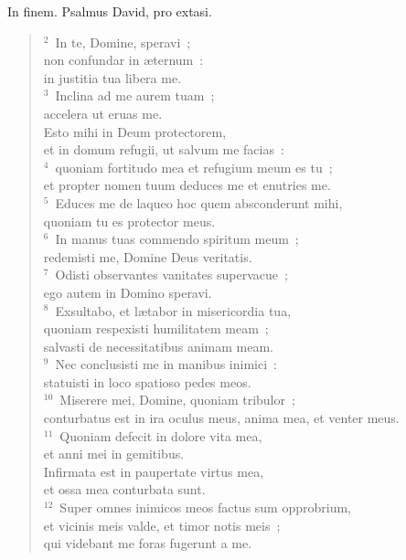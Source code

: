\lettrine[lines=3,image=true,loversize=0.05,lraise=-0.03]{I}{}n finem. Psalmus David, pro extasi.
\begin{flushleft}\begin{verse}\vspace{6pt}${}^{2}$~In te, Domine, speravi~;\\ non confundar in \ae ternum~:\\ in justitia tua libera me.\\
${}^{3}$~Inclina ad me aurem tuam~;\\ accelera ut eruas me.\\ Esto mihi in Deum protectorem,\\ et in domum refugii, ut salvum me facias~:\\
${}^{4}$~quoniam fortitudo mea et refugium meum es tu~;\\ et propter nomen tuum deduces me et enutries me.\\
${}^{5}$~Educes me de laqueo hoc quem absconderunt mihi,\\ quoniam tu es protector meus.\\
${}^{6}$~In manus tuas commendo spiritum meum~;\\ redemisti me, Domine Deus veritatis.\\
${}^{7}$~Odisti observantes vanitates supervacue~;\\ ego autem in Domino speravi.\\
${}^{8}$~Exsultabo, et l\ae tabor in misericordia tua,\\ quoniam respexisti humilitatem meam~;\\ salvasti de necessitatibus animam meam.\\
${}^{9}$~Nec conclusisti me in manibus inimici~:\\ statuisti in loco spatioso pedes meos.\\
${}^{10}$~Miserere mei, Domine, quoniam tribulor~;\\ conturbatus est in ira oculus meus, anima mea, et venter meus.\\
${}^{11}$~Quoniam defecit in dolore vita mea,\\ et anni mei in gemitibus.\\ Infirmata est in paupertate virtus mea,\\ et ossa mea conturbata sunt.\\
${}^{12}$~Super omnes inimicos meos factus sum opprobrium,\\ et vicinis meis valde, et timor notis meis~;\\ qui videbant me foras fugerunt a me.\\

\end{verse}
\end{flushleft}
